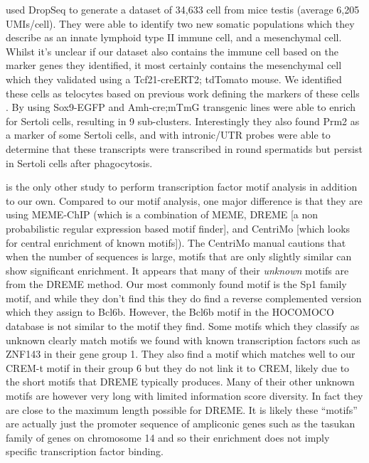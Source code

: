 \cite{Green2018Comprehensive} used DropSeq to generate a dataset of 34,633 cell from mice testis (average 6,205 UMIs/cell). They were able to identify two new somatic populations which they describe as an innate lymphoid type II immune cell, and a mesenchymal cell. Whilst it's unclear if our dataset also contains the immune cell based on the marker genes they identified, it most certainly contains the mesenchymal cell which they validated using a Tcf21-creERT2; tdTomato mouse. We identified these cells as telocytes based on previous work defining the markers of these cells \parencite{Marini2018Reappraising}. By using Sox9-EGFP and Amh-cre;mTmG transgenic lines \cite{Green2018Comprehensive} were able to enrich for Sertoli cells, resulting in 9 sub-clusters. Interestingly they also found Prm2 as a marker of some Sertoli cells, and with intronic/UTR probes were able to determine that these transcripts were transcribed in round spermatids but persist in Sertoli cells after phagocytosis.

\cite{Green2018Comprehensive} is the only other study to perform transcription factor motif analysis in addition to our own. Compared to our motif analysis, one major difference is that they are using MEME-ChIP (which is a combination of MEME, DREME [a non probabilistic regular expression based motif finder], and CentriMo [which looks for central enrichment of known motifs]). The CentriMo manual cautions that when the number of sequences is large, motifs that are only slightly similar can show significant enrichment. It appears that many of their \emph{unknown} motifs are from the DREME method.  Our most commonly found motif is the Sp1 family motif, and while they don't find this they do find a reverse complemented version which they assign to Bcl6b. However, the Bcl6b motif in the HOCOMOCO database is not similar to the motif they find. Some motifs which they classify as unknown clearly match motifs we found with known transcription factors such as ZNF143 in their gene group 1. They also find a motif which matches well to our CREM-t motif in their group 6 but they do not link it to CREM, likely due to the short motifs that DREME typically produces. Many of their other unknown motifs are however very long with limited information score diversity. In fact they are close to the maximum length possible for DREME. It is likely these ``motifs'' are actually just the promoter sequence of ampliconic genes such as the tasukan family of genes on chromosome 14 and so their enrichment does not imply specific transcription factor binding.

